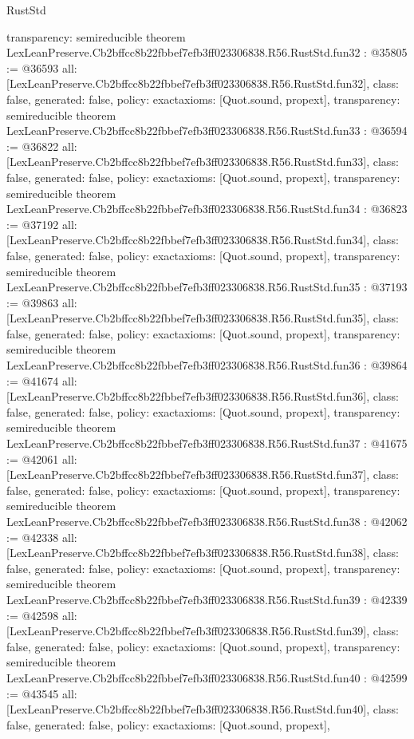 \begin{lexlean}{RustStd}
\begin{coremodule}
{  transparency: semireducible
}
theorem LexLeanPreserve.Cb2bffcc8b22fbbef7efb3ff023306838.R56.RustStd.fun32 : @35805 := @36593 {
  all: [LexLeanPreserve.Cb2bffcc8b22fbbef7efb3ff023306838.R56.RustStd.fun32],
  class: false,
  generated: false,
  policy: exact{axioms: [Quot.sound, propext]},
  transparency: semireducible
}
theorem LexLeanPreserve.Cb2bffcc8b22fbbef7efb3ff023306838.R56.RustStd.fun33 : @36594 := @36822 {
  all: [LexLeanPreserve.Cb2bffcc8b22fbbef7efb3ff023306838.R56.RustStd.fun33],
  class: false,
  generated: false,
  policy: exact{axioms: [Quot.sound, propext]},
  transparency: semireducible
}
theorem LexLeanPreserve.Cb2bffcc8b22fbbef7efb3ff023306838.R56.RustStd.fun34 : @36823 := @37192 {
  all: [LexLeanPreserve.Cb2bffcc8b22fbbef7efb3ff023306838.R56.RustStd.fun34],
  class: false,
  generated: false,
  policy: exact{axioms: [Quot.sound, propext]},
  transparency: semireducible
}
theorem LexLeanPreserve.Cb2bffcc8b22fbbef7efb3ff023306838.R56.RustStd.fun35 : @37193 := @39863 {
  all: [LexLeanPreserve.Cb2bffcc8b22fbbef7efb3ff023306838.R56.RustStd.fun35],
  class: false,
  generated: false,
  policy: exact{axioms: [Quot.sound, propext]},
  transparency: semireducible
}
theorem LexLeanPreserve.Cb2bffcc8b22fbbef7efb3ff023306838.R56.RustStd.fun36 : @39864 := @41674 {
  all: [LexLeanPreserve.Cb2bffcc8b22fbbef7efb3ff023306838.R56.RustStd.fun36],
  class: false,
  generated: false,
  policy: exact{axioms: [Quot.sound, propext]},
  transparency: semireducible
}
theorem LexLeanPreserve.Cb2bffcc8b22fbbef7efb3ff023306838.R56.RustStd.fun37 : @41675 := @42061 {
  all: [LexLeanPreserve.Cb2bffcc8b22fbbef7efb3ff023306838.R56.RustStd.fun37],
  class: false,
  generated: false,
  policy: exact{axioms: [Quot.sound, propext]},
  transparency: semireducible
}
theorem LexLeanPreserve.Cb2bffcc8b22fbbef7efb3ff023306838.R56.RustStd.fun38 : @42062 := @42338 {
  all: [LexLeanPreserve.Cb2bffcc8b22fbbef7efb3ff023306838.R56.RustStd.fun38],
  class: false,
  generated: false,
  policy: exact{axioms: [Quot.sound, propext]},
  transparency: semireducible
}
theorem LexLeanPreserve.Cb2bffcc8b22fbbef7efb3ff023306838.R56.RustStd.fun39 : @42339 := @42598 {
  all: [LexLeanPreserve.Cb2bffcc8b22fbbef7efb3ff023306838.R56.RustStd.fun39],
  class: false,
  generated: false,
  policy: exact{axioms: [Quot.sound, propext]},
  transparency: semireducible
}
theorem LexLeanPreserve.Cb2bffcc8b22fbbef7efb3ff023306838.R56.RustStd.fun40 : @42599 := @43545 {
  all: [LexLeanPreserve.Cb2bffcc8b22fbbef7efb3ff023306838.R56.RustStd.fun40],
  class: false,
  generated: false,
  policy: exact{axioms: [Quot.sound, propext]},
}
\end{coremodule}
\end{lexlean}
